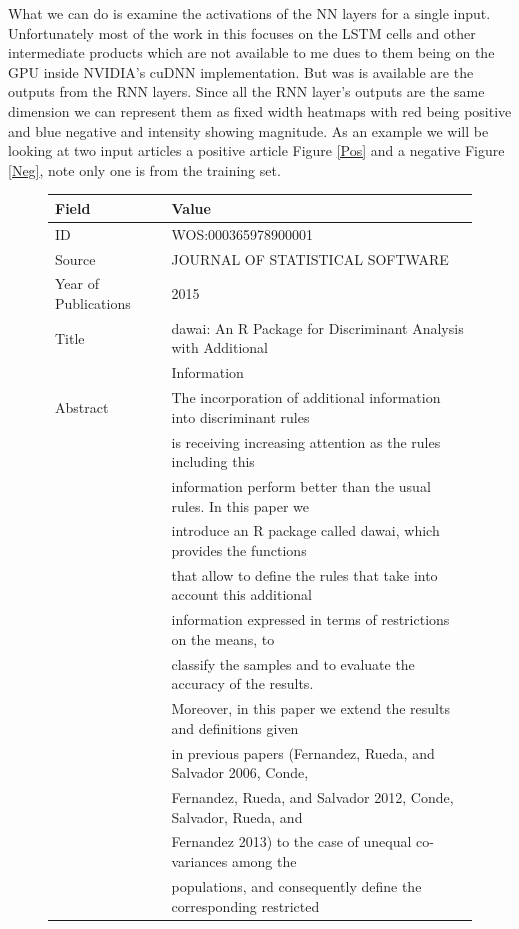 \documentclass[12pt, a4paper]{article}
\begin{document}
What we can do is examine the activations of the NN layers for a single input. Unfortunately most of the work \citep{karpathy2015visualizing} in this focuses on the LSTM cells and other intermediate products which are not available to me dues to them being on the GPU inside NVIDIA's cuDNN implementation\citep{chetlur2014cudnn}. But was is available are the outputs from the RNN layers. Since all the RNN layer's outputs are the same dimension we can represent them as fixed width heatmaps with red being positive and blue negative and intensity showing magnitude. As an example we will be looking at two input articles a positive article Figure \ref{Pos} and a negative Figure \ref{Neg}, note only one is from the training set.

\begin{figure}[H]
	\begin{tabular}{ll}
		\toprule
		Field & Value\\
		\midrule
		ID & WOS:000365978900001 \\
		Source & JOURNAL OF STATISTICAL SOFTWARE \\
		Year of Publications & 2015 \\
		Title &  dawai: An R Package for Discriminant Analysis with Additional\\
		&Information \\
		Abstract &  The incorporation of additional information into discriminant rules\\
		&is receiving increasing attention as the rules including this\\
		&information perform better than the usual rules. In this paper we\\
		&introduce an R package called dawai, which provides the functions\\
		&that allow to define the rules that take into account this additional\\
		&information expressed in terms of restrictions on the means, to\\
		&classify the samples and to evaluate the accuracy of the results.\\
		&Moreover, in this paper we extend the results and definitions given\\
		&in previous papers (Fernandez, Rueda, and Salvador 2006, Conde,\\
		&Fernandez, Rueda, and Salvador 2012, Conde, Salvador, Rueda, and\\
		&Fernandez 2013) to the case of unequal co-variances among the\\
		&populations, and consequently define the corresponding restricted\\

\end{tabular}
\end{figure}
\end{document}
